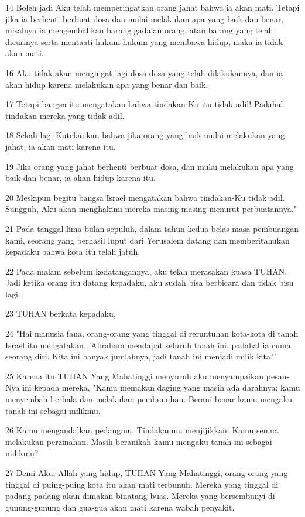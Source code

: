 \par 14 Boleh jadi Aku telah memperingatkan orang jahat bahwa ia akan mati. Tetapi jika ia berhenti berbuat dosa dan mulai melakukan apa yang baik dan benar, misalnya ia mengembalikan barang gadaian orang, atau barang yang telah dicurinya serta mentaati hukum-hukum yang membawa hidup, maka ia tidak akan mati.
\par 16 Aku tidak akan mengingat lagi dosa-dosa yang telah dilakukannya, dan ia akan hidup karena melakukan apa yang benar dan baik.
\par 17 Tetapi bangsa itu mengatakan bahwa tindakan-Ku itu tidak adil! Padahal tindakan mereka yang tidak adil.
\par 18 Sekali lagi Kutekankan bahwa jika orang yang baik mulai melakukan yang jahat, ia akan mati karena itu.
\par 19 Jika orang yang jahat berhenti berbuat dosa, dan mulai melakukan apa yang baik dan benar, ia akan hidup karena itu.
\par 20 Meskipun begitu bangsa Israel mengatakan bahwa tindakan-Ku tidak adil. Sungguh, Aku akan menghakimi mereka masing-masing menurut perbuatannya."
\par 21 Pada tanggal lima bulan sepuluh, dalam tahun kedua belas masa pembuangan kami, seorang yang berhasil luput dari Yerusalem datang dan memberitahukan kepadaku bahwa kota itu telah jatuh.
\par 22 Pada malam sebelum kedatangannya, aku telah merasakan kuasa TUHAN. Jadi ketika orang itu datang kepadaku, aku sudah bisa berbicara dan tidak bisu lagi.
\par 23 TUHAN berkata kepadaku,
\par 24 "Hai manusia fana, orang-orang yang tinggal di reruntuhan kota-kota di tanah Israel itu mengatakan, 'Abraham mendapat seluruh tanah ini, padahal ia cuma seorang diri. Kita ini banyak jumlahnya, jadi tanah ini menjadi milik kita.'"
\par 25 Karena itu TUHAN Yang Mahatinggi menyuruh aku menyampaikan pesan-Nya ini kepada mereka, "Kamu memakan daging yang masih ada darahnya; kamu menyembah berhala dan melakukan pembunuhan. Berani benar kamu mengaku tanah ini sebagai milikmu.
\par 26 Kamu mengandalkan pedangmu. Tindakanmu menjijikkan. Kamu semua melakukan perzinahan. Masih beranikah kamu mengaku tanah ini sebagai milikmu?
\par 27 Demi Aku, Allah yang hidup, TUHAN Yang Mahatinggi, orang-orang yang tinggal di puing-puing kota itu akan mati terbunuh. Mereka yang tinggal di padang-padang akan dimakan binatang buas. Mereka yang bersembunyi di gunung-gunung dan gua-gua akan mati karena wabah penyakit.
